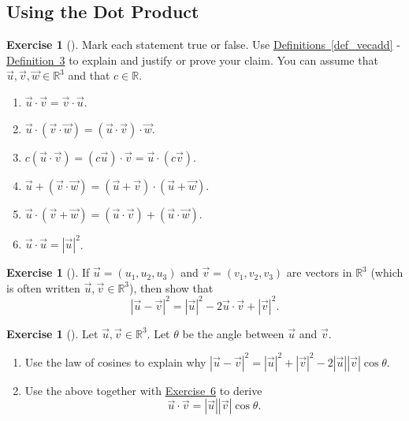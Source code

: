 \documentclass[10pt,]{book}
\theoremstyle{plain}
\theoremstyle{definition}
\theoremstyle{definition}
\theoremstyle{definition}
\theoremstyle{definition}
\newtheorem{exploration}[project]{Exercise}
\theoremstyle{definition}
\numberwithin{equation}{section}
\begin{document}
\subsection[{Using the Dot Product}]{Using the Dot Product}\label{subsection-9}
\begin{exploration}[]\label{dot_product_facts}
Mark each statement true or false. Use \hyperref[def_vecadd]{Definitions~\ref{def_vecadd}} - \hyperref[def_orthogonal]{Definition~3} to explain and justify or prove your claim. You can assume that \(\vec u,\vec v,\vec w\in\mathbb{R}^3\) and that \(c\in\mathbb{R}\).%
\begin{enumerate}[font=\bfseries,label=(\alph*),ref=\alph*]
\item\label{task-62} \(\vec u\cdot \vec v=\vec v\cdot \vec u\).%
\item\label{task-63} \(\vec u\cdot (\vec v\cdot \vec w)=(\vec u\cdot\vec v)\cdot\vec w\).%
\item\label{task-64} \(c(\vec u\cdot \vec v)=(c\vec u)\cdot \vec v=\vec u\cdot (c\vec v)\).%
\item\label{task-65} \(\vec u+(\vec v\cdot \vec w)=(\vec u+\vec v)\cdot(\vec u+\vec w)\).%
\item\label{task-66} \(\vec u\cdot (\vec v+ \vec w)=(\vec u\cdot \vec v)+(\vec u\cdot\vec w)\).%
\item\label{task-67} \(\vec u\cdot \vec u= |\vec u|^2\).%
\end{enumerate}
\end{exploration}
\begin{exploration}[]\label{prob_dot_prep}
If \(\vec u = (u_1,u_2,u_3)\) and \(\vec v= (v_1,v_2,v_3)\) are vectors in \(\mathbb{R}^3\) (which is often written \(\vec u,\vec v\in\mathbb{R}^3\)), then show that%
\begin{equation*}
|\vec u-\vec v|^2 = |\vec u|^2-2\vec u\cdot \vec v +|\vec v|^2.
\end{equation*}
%
\end{exploration}
\begin{exploration}[]\label{prob_dot_angle_formula}
Let \(\vec u,\vec v\in\mathbb{R}^3\). Let \(\theta\) be the angle between \(\vec u\) and \(\vec v\).%
\begin{enumerate}[font=\bfseries,label=(\alph*),ref=\alph*]
\item\label{task-68} Use the law of cosines to explain why \(|\vec u-\vec v|^2=|\vec u|^2+|\vec v|^2-2|\vec u||\vec v|\cos\theta\).%
\item\label{task-69} Use the above together with \hyperref[prob_dot_prep]{Exercise~6} to derive%
\begin{equation*}
\vec u\cdot \vec v=|\vec u||\vec v|\cos\theta.
\end{equation*}
%
\end{enumerate}
\end{exploration}
\end{document}
